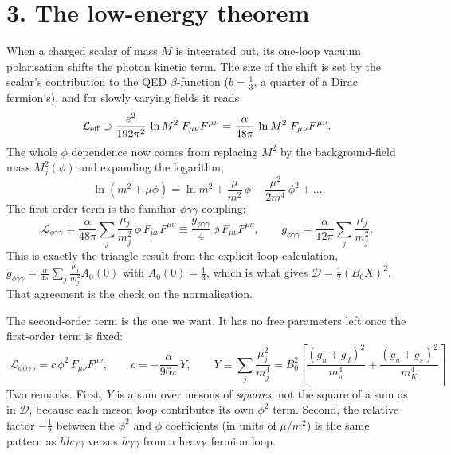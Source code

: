 \documentclass[11pt]{article}
\newcommand{\Fsq}{F_{\mu\nu}F^{\mu\nu}}
\begin{document}
\section*{3. The low-energy theorem}
When a charged scalar of mass $M$ is integrated out, its one-loop vacuum
polarisation shifts the photon kinetic term. The size of the shift is set by
the scalar's contribution to the QED $\beta$-function ($b=\tfrac13$, a quarter
of a Dirac fermion's), and for slowly varying fields it reads
\begin{equation}
  \mathcal L_{\rm eff} \supset \frac{e^2}{192\pi^2}\,\ln M^2\;\Fsq
  = \frac{\alpha}{48\pi}\,\ln M^2\;\Fsq .
\end{equation}
The whole $\phi$ dependence now comes from replacing $M^2$ by the
background-field mass $M_j^2(\phi)$ and expanding the logarithm,
\begin{equation}
  \ln(m^2+\mu\phi) = \ln m^2 + \frac{\mu}{m^2}\,\phi - \frac{\mu^2}{2m^4}\,\phi^2 + \dots
\end{equation}
The first-order term is the familiar $\phi\gamma\gamma$ coupling:
\begin{equation}
  \mathcal L_{\phi\gamma\gamma}
     = \frac{\alpha}{48\pi}\sum_j\frac{\mu_j}{m_j^2}\,\phi\,\Fsq
     \equiv \frac{g_{\phi\gamma\gamma}}{4}\,\phi\,\Fsq,
     \qquad g_{\phi\gamma\gamma} = \frac{\alpha}{12\pi}\sum_j\frac{\mu_j}{m_j^2}.
\end{equation}
This is exactly the triangle result from the explicit loop calculation,
$g_{\phi\gamma\gamma} = \frac{\alpha}{4\pi}\sum_j \frac{\mu_j}{m_j^2}A_0(0)$
with $A_0(0)=\tfrac13$, which is what gives $\mathcal D=\tfrac12(B_0X)^2$. That
agreement is the check on the normalisation.

The second-order term is the one we want. It has no free parameters left once
the first-order term is fixed:
\begin{equation}
  \boxed{\;\mathcal L_{\phi\phi\gamma\gamma}
     = c\,\phi^2\,\Fsq,\qquad c = -\frac{\alpha}{96\pi}\,Y,\qquad
     Y \equiv \sum_j\frac{\mu_j^2}{m_j^4}
     = B_0^2\!\left[\frac{(g_u+g_d)^2}{m_\pi^4}+\frac{(g_u+g_s)^2}{m_K^4}\right]\;}
\end{equation}
Two remarks. First, $Y$ is a sum over mesons of \emph{squares}, not the square
of a sum as in $\mathcal D$, because each meson loop contributes its own
$\phi^2$ term. Second, the relative factor $-\tfrac12$ between the $\phi^2$
and $\phi$ coefficients (in units of $\mu/m^2$) is the same pattern as
$hh\gamma\gamma$ versus $h\gamma\gamma$ from a heavy fermion loop.
\end{document}
